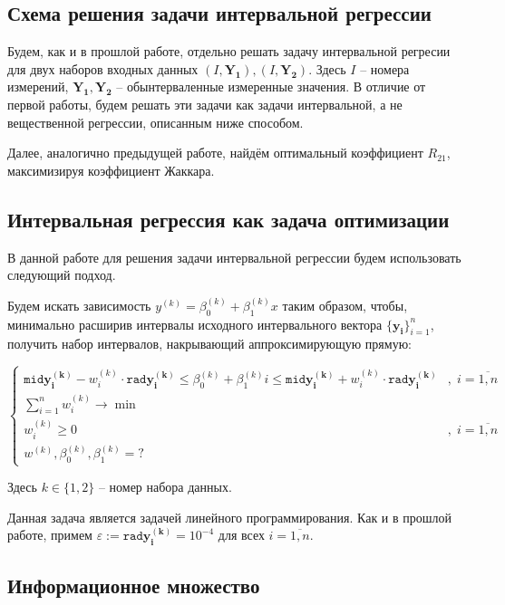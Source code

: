 \subsection{Схема решения задачи интервальной регрессии}
Будем, как и в прошлой работе, отдельно решать задачу интервальной регресии для двух наборов входных данных $(I, \mathbf{Y_1}), (I, \mathbf{Y_2})$. Здесь $I$ -- номера измерений, $\mathbf{Y_1}, \mathbf{Y_2}$ -- обынтерваленные измеренные значения. В отличие от первой работы, будем решать эти задачи как задачи интервальной, а не вещественной регрессии, описанным ниже способом.

Далее, аналогично предыдущей работе, найдём оптимальный коэффициент $R_{21}$, максимизируя коэффициент Жаккара.

\subsection{Интервальная регрессия как задача оптимизации}
В данной работе для решения задачи интервальной регрессии будем использовать следующий подход.

Будем искать зависимость $y^{(k)} = \beta_0^{(k)} + \beta_1^{(k)}x$ таким образом, чтобы, минимально расширив интервалы исходного интервального вектора $\{\mathbf{y_i}\}_{i=1}^{n}$, получить набор интервалов, накрывающий аппроксимирующую прямую:

\begin{equation} \label{regropt}
\begin{cases}
\mathtt{mid} \mathbf{y^{(k)}_i} - w^{(k)}_i \cdot \mathtt{rad} \mathbf{y^{(k)}_i} \leq \beta_0^{(k)} + \beta_1^{(k)} i \leq \mathtt{mid} \mathbf{y^{(k)}_i} + w^{(k)}_i \cdot \mathtt{rad} \mathbf{y^{(k)}_i} & , \; i = \overline{1, n}\\
\displaystyle\sum_{i=1}^{n} w_i^{(k)} \longrightarrow \min & \\
w_i^{(k)} \geq 0 & , \; i = \overline{1, n} \\
w^{(k)}, \beta_0^{(k)}, \beta_1^{(k)} = ? &
\end{cases}
\end{equation}

Здесь $k \in \{1, 2\}$ -- номер набора данных.

Данная задача является задачей линейного программирования. Как и в прошлой работе, примем $\varepsilon := \mathtt{rad} \mathbf{y_i^{(k)}} = 10^{-4}$ для всех $i = \overline{1, n}$.

\subsection{Информационное множество}

